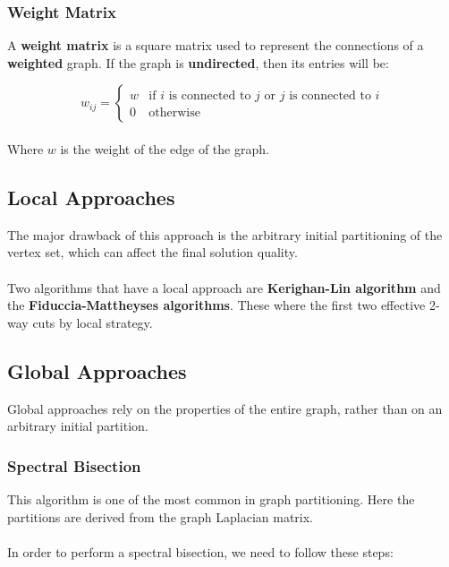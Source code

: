 \documentclass{article}
\begin{document}
\subsubsection{Weight Matrix}
A \textbf{weight matrix} is a square matrix used to represent the connections of a \textbf{weighted} graph. If the graph is \textbf{undirected}, then its entries will be:

\[ w_{ij} = \begin{cases} w & \text{if $i$ is connected to $j$ or $j$ is connected to $i$} \\ 0 & \text{otherwise} \end{cases} \]\\
Where $w$ is the weight of the edge of the graph.

\subsection{Local Approaches}
The major drawback of this approach is the arbitrary initial partitioning of the vertex set, which can affect the final solution quality. \\ \\
Two algorithms that have a local approach are \textbf{Kerighan-Lin algorithm} and the \textbf{Fiduccia-Mattheyses algorithms}. These where the first two effective 2-way cuts by local strategy.

\subsection{Global Approaches}
Global approaches rely on the properties of the entire graph, rather than on an arbitrary initial partition.

\subsubsection{Spectral Bisection}
This algorithm is one of the most common in graph partitioning. Here the partitions are derived from the graph Laplacian matrix. \\ \\
In order to perform a spectral bisection, we need to follow these steps:
\end{document}
